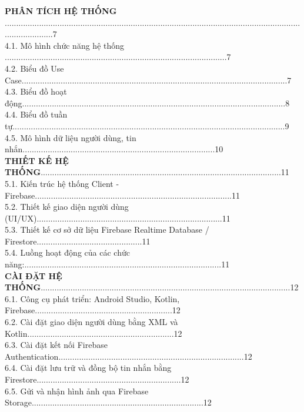 \documentclass[12pt,a4paper]{article}
\begin{document}
\begin{flushleft}
		\vspace{0.5cm}
		\textbf{PHÂN TÍCH HỆ THỐNG} ......................................................................................................................................................7\\
		4.1. Mô hình chức năng hệ thống .................................................................................................7\\
		4.2. Biểu đồ Use Case....................................................................................................................7 \\
		4.3. Biểu đồ hoạt động...................................................................................................................8 \\
		4.4. Biểu đồ tuần tự.......................................................................................................................9 \\
		4.5. Mô hình dữ liệu người dùng, tin nhắn....................................................................................10\\
		
		\vspace{0.5cm}
		\textbf{THIẾT KẾ HỆ THỐNG}.........................................................................................................11 \\
		5.1. Kiến trúc hệ thống Client - Firebase......................................................................................11 \\
		5.2. Thiết kế giao diện người dùng (UI/UX).................................................................................11\\
		5.3. Thiết kế cơ sở dữ liệu Firebase Realtime Database / Firestore..............................................11\\
		5.4. Luồng hoạt động của các chức năng:......................................................................................11\\
		
		\vspace{0.5cm}
		\textbf{CÀI ĐẶT HỆ THỐNG}.............................................................................................................12\\
		6.1. Công cụ phát triển: Android Studio, Kotlin, Firebase............................................................12\\
		6.2. Cài đặt giao diện người dùng bằng XML và Kotlin................................................................12\\
		6.3. Cài đặt kết nối Firebase Authentication.................................................................................12\\
		6.4. Cài đặt lưu trữ và đồng bộ tin nhắn bằng Firestore...............................................................12\\
		6.5. Gửi và nhận hình ảnh qua Firebase Storage...........................................................................12\\
		

\end{flushleft}
\end{document}
